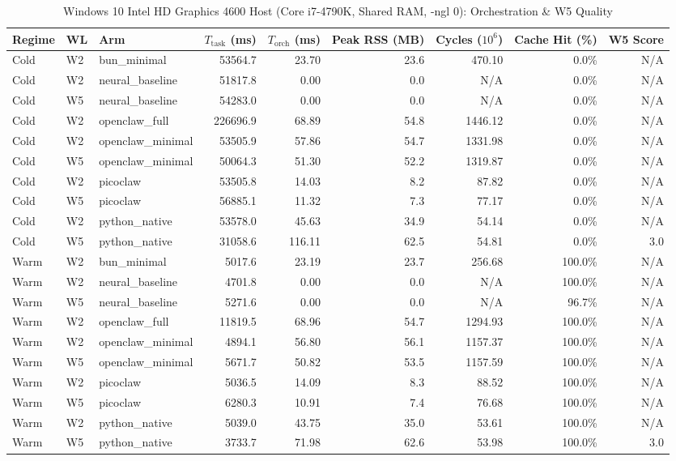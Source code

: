 \begin{table}[t]
\centering\small
\caption{Windows 10 Intel HD Graphics 4600 Host (Core i7-4790K, Shared RAM, -ngl 0): Orchestration & W5 Quality}
\begin{tabular}{lllrrrrrr}
\toprule
Regime & WL & Arm & $T_{\text{task}}$ (ms) & $T_{\text{orch}}$ (ms) & Peak RSS (MB) & Cycles ($10^6$) & Cache Hit (\%) & W5 Score \\
\midrule
Cold & W2 & bun\_minimal & 53564.7 & 23.70 & 23.6 & 470.10 & 0.0\% & N/A \\
Cold & W2 & neural\_baseline & 51817.8 & 0.00 & 0.0 & N/A & 0.0\% & N/A \\
Cold & W5 & neural\_baseline & 54283.0 & 0.00 & 0.0 & N/A & 0.0\% & N/A \\
Cold & W2 & openclaw\_full & 226696.9 & 68.89 & 54.8 & 1446.12 & 0.0\% & N/A \\
Cold & W2 & openclaw\_minimal & 53505.9 & 57.86 & 54.7 & 1331.98 & 0.0\% & N/A \\
Cold & W5 & openclaw\_minimal & 50064.3 & 51.30 & 52.2 & 1319.87 & 0.0\% & N/A \\
Cold & W2 & picoclaw & 53505.8 & 14.03 & 8.2 & 87.82 & 0.0\% & N/A \\
Cold & W5 & picoclaw & 56885.1 & 11.32 & 7.3 & 77.17 & 0.0\% & N/A \\
Cold & W2 & python\_native & 53578.0 & 45.63 & 34.9 & 54.14 & 0.0\% & N/A \\
Cold & W5 & python\_native & 31058.6 & 116.11 & 62.5 & 54.81 & 0.0\% & 3.0 \\
Warm & W2 & bun\_minimal & 5017.6 & 23.19 & 23.7 & 256.68 & 100.0\% & N/A \\
Warm & W2 & neural\_baseline & 4701.8 & 0.00 & 0.0 & N/A & 100.0\% & N/A \\
Warm & W5 & neural\_baseline & 5271.6 & 0.00 & 0.0 & N/A & 96.7\% & N/A \\
Warm & W2 & openclaw\_full & 11819.5 & 68.96 & 54.7 & 1294.93 & 100.0\% & N/A \\
Warm & W2 & openclaw\_minimal & 4894.1 & 56.80 & 56.1 & 1157.37 & 100.0\% & N/A \\
Warm & W5 & openclaw\_minimal & 5671.7 & 50.82 & 53.5 & 1157.59 & 100.0\% & N/A \\
Warm & W2 & picoclaw & 5036.5 & 14.09 & 8.3 & 88.52 & 100.0\% & N/A \\
Warm & W5 & picoclaw & 6280.3 & 10.91 & 7.4 & 76.68 & 100.0\% & N/A \\
Warm & W2 & python\_native & 5039.0 & 43.75 & 35.0 & 53.61 & 100.0\% & N/A \\
Warm & W5 & python\_native & 3733.7 & 71.98 & 62.6 & 53.98 & 100.0\% & 3.0 \\
\bottomrule
\end{tabular}
\end{table}
